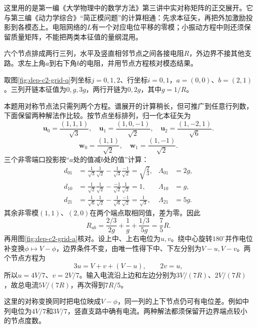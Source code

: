 这里用的是第一编《大学物理中的数学方法》第三讲中实对称矩阵的正交展开。它与第三编《动力学综合》“简正模问题”的计算相通：先求本征矢，再把外加激励投影到各模态上。电阻网络的$L$有一个对应电位平移的零模；小振动方程中则还须保留质量矩阵，不能把两类本征值的量纲混用。

\begin{example}[两行三列矩形网的对角端口]
六个节点排成两行三列，水平及竖直相邻节点之间各接电阻$R$，外边界不接其他支路。求左上角$a$到右下角$b$的电阻，并用节点方程核对模态结果。
\end{example}
\begin{solution}
取图\ref{fig:dep-c2-grid-q}列坐标$j=0,1,2$、行坐标$i=0,1$，$a=(0,0)$、$b=(2,1)$。三列开链本征值为$0,g,3g$，两行开链为$0,2g$，其中$g=1/R$。

本题用对称节点法只需列两个方程。谱展开的计算稍长，但可推广到任意行列数，下面保留两种解法作比较。按节点坐标排列，归一化本征矢为
\[
 \boldsymbol u_0=\frac{(1,1,1)}{\sqrt3},\quad
 \boldsymbol u_1=\frac{(1,0,-1)}{\sqrt2},\quad
 \boldsymbol u_2=\frac{(1,-2,1)}{\sqrt6}.
\]
\[
 \boldsymbol w_0=\frac{(1,1)}{\sqrt2},\quad
 \boldsymbol w_1=\frac{(1,-1)}{\sqrt2}.
\]
三个非零端口投影按“$a$处的值减$b$处的值”计算：
\begin{align*}
 d_{01}&=\frac1{\sqrt3}\frac1{\sqrt2}
       -\frac1{\sqrt3}\frac{-1}{\sqrt2}=\sqrt{\frac23},
       &\Lambda_{01}&=2g,\\
 d_{10}&=\frac1{\sqrt2}\frac1{\sqrt2}
       -\frac{-1}{\sqrt2}\frac1{\sqrt2}=1,
       &\Lambda_{10}&=g,\\
 d_{21}&=\frac1{\sqrt6}\frac1{\sqrt2}
       -\frac1{\sqrt6}\frac{-1}{\sqrt2}=\frac1{\sqrt3},
       &\Lambda_{21}&=5g.
\end{align*}
其余非零模$(1,1)$、$(2,0)$在两个端点取相同值，差为零。因此
\[
 R_{ab}=\frac{2/3}{2g}+\frac1g+\frac{1/3}{5g}
 =\frac75R.
\]
再用图\ref{fig:dep-c2-grid-a}核对。设上中、上右电位为$u,v$。绕中心旋转$180^\circ$并作电位补变换$\phi\mapsto V-\phi$，边界条件不变，由唯一性得下中、下左分别为$V-u,V-v$。两个节点方程为
\[
 3u=V+v+(V-u),\qquad 2v=u,
\]
所以$u=4V/7$、$v=2V/7$。输入电流沿上边和左边分别为$3V/(7R)$、$2V/(7R)$，故总电流$5V/(7R)$，再次得到$7R/5$。

这里的对称变换同时把电位映成$V-\phi$，同一列的上下节点仍可有电位差。例如中列电位为$4V/7$和$3V/7$，竖直支路中确有电流。两种解法都须保留开边界端点较小的节点度数。
\end{solution}

